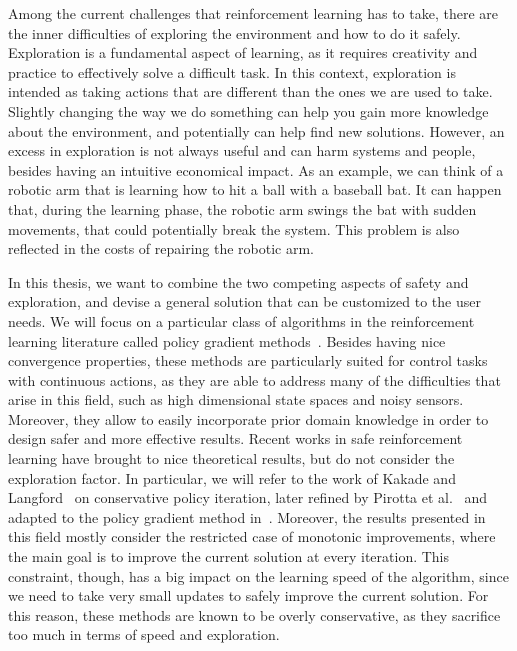 Among the current challenges that reinforcement learning has to take, there are the inner difficulties of exploring the environment and how to do it safely. Exploration is a fundamental aspect of learning, as it requires creativity and practice to effectively solve a difficult task. In this context, exploration is intended as taking actions that are different than the ones we are used to take. Slightly changing the way we do something can help you gain more knowledge about the environment, and potentially can help find new solutions. However, an excess in exploration is not always useful and can harm systems and people, besides having an intuitive economical impact. As an example, we can think of a robotic arm that is learning how to hit a ball with a baseball bat. It can happen that, during the learning phase, the robotic arm swings the bat with sudden movements, that could potentially break the system. This problem is also reflected in the costs of repairing the robotic arm.

In this thesis, we want to combine the two competing aspects of safety and exploration, and devise a general solution that can be customized to the user needs. We will focus on a particular class of algorithms in the reinforcement learning literature called policy gradient methods~\cite{peters}. Besides having nice convergence properties, these methods are particularly suited for control tasks with continuous actions, as they are able to address many of the difficulties that arise in this field, such as high dimensional state spaces and noisy sensors. Moreover, they allow to easily incorporate prior domain knowledge in order to design safer and more effective results. Recent works in safe reinforcement learning have brought to nice theoretical results, but do not consider the exploration factor. In particular, we will refer to the work of Kakade and Langford~\cite{Kakade02approximatelyoptimal} on conservative policy iteration, later refined by Pirotta et al.~\cite{safe_iteration} and adapted to the policy gradient method in~\cite{adaptive_step}. Moreover, the results presented in this field mostly consider the restricted case of monotonic improvements, where the main goal is to improve the current solution at every iteration. This constraint, though, has a big impact on the learning speed of the algorithm, since we need to take very small updates to safely improve the current solution. For this reason, these methods are known to be overly conservative, as they sacrifice too much in terms of speed and exploration. 

